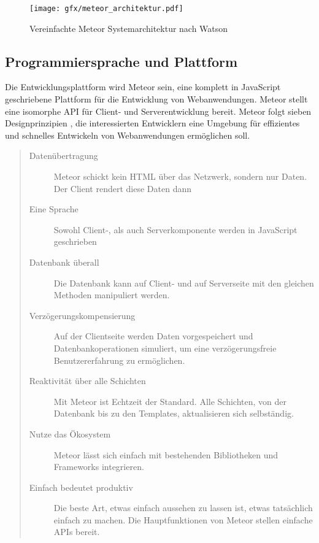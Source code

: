 \begin{figure}[h]
  \texttt{[image: gfx/meteor\_architektur.pdf]}
  \caption{Vereinfachte Meteor Systemarchitektur nach Watson \cite{meteor-architecture}}
  \label{fig:MeteorArchitektur}
\end{figure}

\subsection{Programmiersprache und Plattform}

Die Entwicklungsplattform wird Meteor sein, eine komplett in JavaScript
geschriebene Plattform für die Entwicklung von Webanwendungen. Meteor stellt
eine isomorphe API für Client- und Serverentwicklung bereit. Meteor folgt sieben
Designprinzipien \cite{meteor-7}, die interessierten Entwicklern eine Umgebung
für effizientes und schnelles Entwickeln von Webanwendungen ermöglichen soll.

\begin{quotation}

  \begin{description}

    \item[Datenübertragung]{Meteor schickt kein HTML über das Netzwerk, sondern
    nur Daten. Der Client rendert diese Daten dann}

    \item[Eine Sprache]{Sowohl Client-, als auch Serverkomponente werden in
    JavaScript geschrieben}

    \item[Datenbank überall]{Die Datenbank kann auf Client- und auf Serverseite
    mit den gleichen Methoden manipuliert werden.}

    \item[Verzögerungskompensierung]{Auf der Clientseite werden Daten
    vorgespeichert und Datenbankoperationen simuliert, um eine verzögerungsfreie
    Benutzererfahrung zu ermöglichen.}

    \item[Reaktivität über alle Schichten]{Mit Meteor ist Echtzeit der Standard.
    Alle Schichten, von der Datenbank bis zu den Templates, aktualisieren sich
    selbständig.}

    \item[Nutze das Ökosystem]{Meteor lässt sich einfach mit bestehenden
    Bibliotheken und Frameworks integrieren.}

    \item[Einfach bedeutet produktiv]{Die beste Art, etwas einfach aussehen zu
    lassen ist, etwas tatsächlich einfach zu machen. Die Hauptfunktionen von
    Meteor stellen einfache APIs bereit.}

  \end{description}

\end{quotation}

